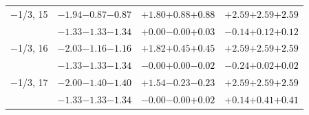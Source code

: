 \documentclass[compress]{beamer}
\begin{document}
\begin{frame}
\begin{tabular}{r | c | c | c}
$-$1/3, 15 & $-1.94$\hspace{0.1 cm}$-0.87$\hspace{0.1 cm}\textcolor{black}{$-0.87$} & $+1.80$\hspace{0.1 cm}$+0.88$\hspace{0.1 cm}\textcolor{black}{$+0.88$} & $+2.59$\hspace{0.1 cm}$+2.59$\hspace{0.1 cm}\textcolor{black}{$+2.59$} \\
           & $-1.33$\hspace{0.1 cm}$-1.33$\hspace{0.1 cm}\textcolor{black}{$-1.34$} & $+0.00$\hspace{0.1 cm}$-0.00$\hspace{0.1 cm}\textcolor{black}{$+0.03$} & $-0.14$\hspace{0.1 cm}$+0.12$\hspace{0.1 cm}\textcolor{black}{$+0.12$} \\
$-$1/3, 16 & $-2.03$\hspace{0.1 cm}$-1.16$\hspace{0.1 cm}\textcolor{black}{$-1.16$} & $+1.82$\hspace{0.1 cm}$+0.45$\hspace{0.1 cm}\textcolor{black}{$+0.45$} & $+2.59$\hspace{0.1 cm}$+2.59$\hspace{0.1 cm}\textcolor{black}{$+2.59$} \\
           & $-1.33$\hspace{0.1 cm}$-1.33$\hspace{0.1 cm}\textcolor{black}{$-1.34$} & $-0.00$\hspace{0.1 cm}$+0.00$\hspace{0.1 cm}\textcolor{black}{$-0.02$} & $-0.24$\hspace{0.1 cm}$+0.02$\hspace{0.1 cm}\textcolor{black}{$+0.02$} \\
$-$1/3, 17 & $-2.00$\hspace{0.1 cm}$-1.40$\hspace{0.1 cm}\textcolor{black}{$-1.40$} & $+1.54$\hspace{0.1 cm}$-0.23$\hspace{0.1 cm}\textcolor{black}{$-0.23$} & $+2.59$\hspace{0.1 cm}$+2.59$\hspace{0.1 cm}\textcolor{black}{$+2.59$} \\
           & $-1.33$\hspace{0.1 cm}$-1.33$\hspace{0.1 cm}\textcolor{black}{$-1.34$} & $-0.00$\hspace{0.1 cm}$-0.00$\hspace{0.1 cm}\textcolor{black}{$+0.02$} & $+0.14$\hspace{0.1 cm}$+0.41$\hspace{0.1 cm}\textcolor{black}{$+0.41$} \\

\end{tabular}
\end{frame}
\end{document}
